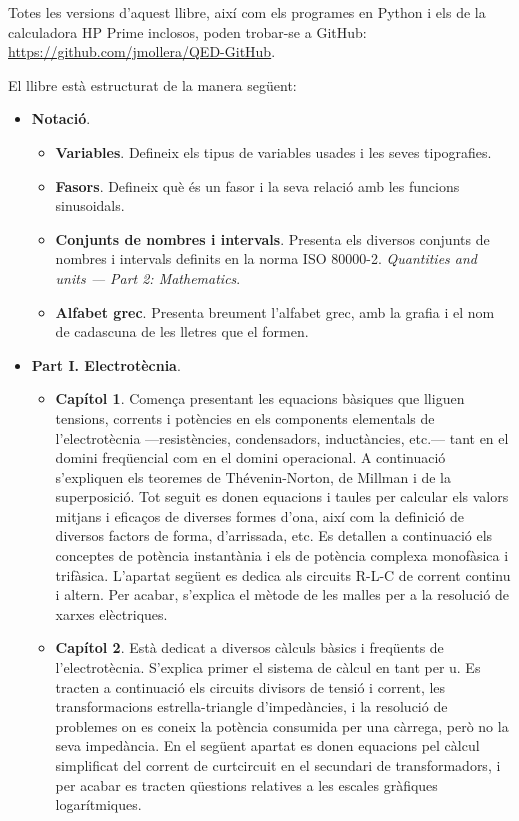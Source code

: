      Totes les versions d'aquest llibre, així com els programes en Python i els de la calculadora \textsf{HP Prime} inclosos, poden trobar-se a GitHub: \href{https://github.com/jmollera/QED-GitHub}{https:/\!\!/github.com/jmollera/QED-GitHub}.

	El llibre està estructurat de la manera següent:
	\begin{itemize}
		\item \textbf{Notació}.
		\begin{itemize}
			\item \textbf{Variables}. Defineix els tipus de variables usades i les seves tipografies.
			\item \textbf{Fasors}. Defineix què és un fasor i la seva relació amb les funcions sinusoidals.
			\item \textbf{Conjunts de nombres i intervals}. Presenta  els diversos conjunts de nombres i  intervals definits en la norma ISO 80000-2.
			\textit{Quantities and units --- Part 2: Mathematics}.
			\item \textbf{Alfabet grec}.  Presenta breument l'alfabet grec, amb la grafia i el nom de cadascuna de les lletres que el formen.
		\end{itemize}
		\item \textbf{Part I. Electrotècnia}. 
		\begin{itemize}
			\item \textbf{Capítol 1}. Comença presentant les equacions bàsiques que lliguen tensions, corrents i potències en els components elementals de l'electrotècnia ---resistències, condensadors, inductàncies, etc.--- tant en el domini freqüencial com en el domini operacional. A continuació s'expliquen els teoremes de Thévenin-Norton, de Millman i de la superposició. Tot seguit es donen equacions i taules per calcular els valors mitjans i eficaços de diverses formes d'ona, així com la definició de diversos factors de forma, d'arrissada, etc. Es detallen a continuació els conceptes de potència instantània i els de potència complexa monofàsica i trifàsica. L'apartat següent es dedica  als circuits R-L-C de corrent continu i altern. Per acabar, s'explica el mètode de les malles per a la resolució de xarxes elèctriques.
			\item \textbf{Capítol 2}. Està dedicat a diversos càlculs bàsics i freqüents de l'electrotècnia. S'explica primer el sistema de càlcul en tant per u. Es tracten a continuació els circuits  divisors de tensió i corrent,  les transformacions estrella-triangle d'impedàncies, i la resolució de problemes on es coneix la potència consumida per una càrrega, però no la seva impedància. En el següent apartat es donen equacions pel càlcul simplificat del corrent de curtcircuit en el secundari de transformadors, i per acabar es tracten  qüestions relatives a les  escales gràfiques logarítmiques.

\end{itemize}
\end{itemize}
